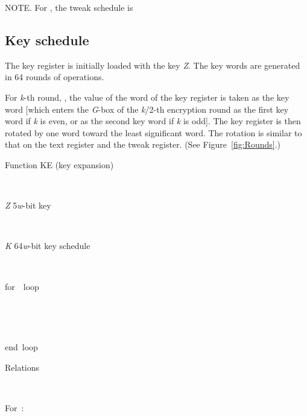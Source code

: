 \documentclass[a4paper,oneside,english]{amsart}
\numberwithin{equation}{section}
\numberwithin{figure}{section}
\newenvironment{lyxlist}[1]
{\begin{list}{}
{\settowidth{\labelwidth}{#1}
 \setlength{\leftmargin}{\labelwidth}
 \addtolength{\leftmargin}{\labelsep}
 \renewcommand{\makelabel}[1]{##1\hfil}}}
{\end{list}}
\newenvironment{lyxcode}
{\par\begin{list}{}{
\setlength{\rightmargin}{\leftmargin}
\setlength{\listparindent}{0pt}\raggedright
\setlength{\itemsep}{0pt}
\setlength{\parsep}{0pt}
\normalfont\ttfamily}\item[]}
{\end{list}}
\begin{document}
NOTE. For , the tweak schedule is





\subsection{Key schedule}

The key register  is initially loaded
with the key \emph{Z}. The key words are generated in 64 rounds of
operations. 

For \emph{k}-th round, , the value of the word 
of the key register is taken as the key word  {[}which enters
the \emph{G}-box of the \emph{k}/2-th encryption round as the first
key word if \emph{k} is even, or as the second key word if \emph{k}
is odd{]}. The key register is then rotated by one word toward the
least significant word. The rotation is similar to that on the text
register and the tweak register. (See Figure~\ref{fig:Rounds}.)

\begin{algorithm}


\caption{\label{alg:Function-KE}Function KE (key expansion)}

\begin{description}
\item [{Input}]~

\begin{lyxlist}{00.00.0000}
\item [{\emph{Z}}] 5\emph{w}-bit key
\end{lyxlist}
\item [{Output}]~

\begin{lyxlist}{00.00.0000}
\item [{\emph{K}}] 64\emph{w}-bit key schedule
\end{lyxlist}
\item [{Pseudo-code}]~\end{description}
\begin{lyxcode}


for~~loop

~~

~~

end~loop\end{lyxcode}
\begin{description}
\item [{Relations}]~\end{description}
\begin{lyxcode}


For~:~

~~

~~

~~

~~

~~

~~

\end{lyxcode}
\end{algorithm}
\end{document}
